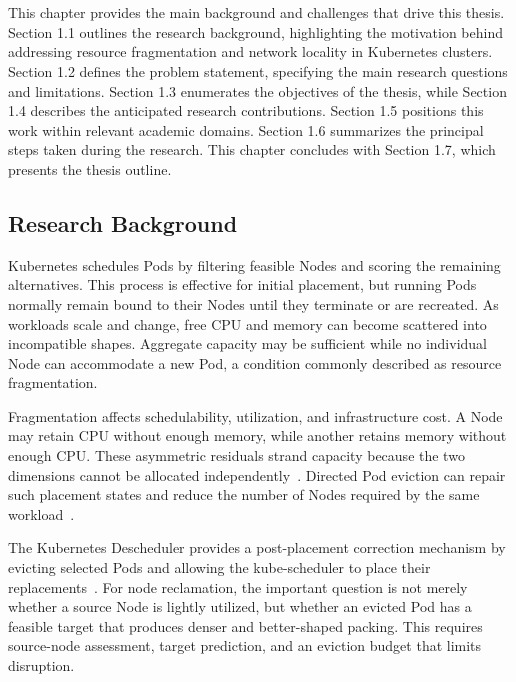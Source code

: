 \chapter{\babSatu}
\label{bab:1}
This chapter provides the main background and challenges that drive this thesis. Section 1.1 outlines the research background, highlighting the motivation behind addressing resource fragmentation and network locality in Kubernetes clusters. Section 1.2 defines the problem statement, specifying the main research questions and limitations. Section 1.3 enumerates the objectives of the thesis, while Section 1.4 describes the anticipated research contributions. Section 1.5 positions this work within relevant academic domains. Section 1.6 summarizes the principal steps taken during the research. This chapter concludes with Section 1.7, which presents the thesis outline.

\section{Research Background}
\label{sec:researchBackground}

Kubernetes schedules Pods by filtering feasible Nodes and scoring the remaining alternatives. This process is effective for initial placement, but running Pods normally remain bound to their Nodes until they terminate or are recreated. As workloads scale and change, free CPU and memory can become scattered into incompatible shapes. Aggregate capacity may be sufficient while no individual Node can accommodate a new Pod, a condition commonly described as resource fragmentation.

Fragmentation affects schedulability, utilization, and infrastructure cost. A Node may retain CPU without enough memory, while another retains memory without enough CPU. These asymmetric residuals strand capacity because the two dimensions cannot be allocated independently~\citep{xiao2013dynamic,guo2025joint}. Directed Pod eviction can repair such placement states and reduce the number of Nodes required by the same workload~\citep{larsson_klein_elmroth_2023}.

The Kubernetes Descheduler provides a post-placement correction mechanism by evicting selected Pods and allowing the kube-scheduler to place their replacements~\citep{k8s_descheduler_docs}. For node reclamation, the important question is not merely whether a source Node is lightly utilized, but whether an evicted Pod has a feasible target that produces denser and better-shaped packing. This requires source-node assessment, target prediction, and an eviction budget that limits disruption.

